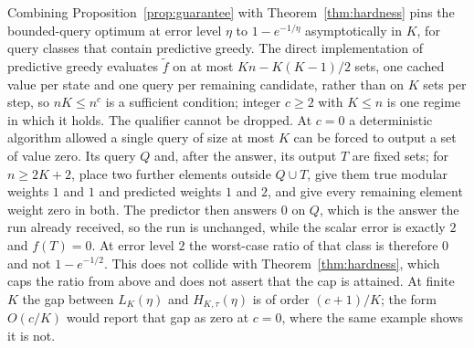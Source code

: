 \begin{remark}\label{rem:hardness-pins}
Combining Proposition~\ref{prop:guarantee} with Theorem~\ref{thm:hardness}
pins the bounded-query optimum at error level $\eta$ to $1-e^{-1/\eta}$
asymptotically in $K$, for query classes that contain predictive greedy.  The
direct implementation of predictive greedy evaluates $\tilde f$ on at most
$Kn-K(K-1)/2$ sets, one cached value per state and one query per remaining
candidate, rather than on $K$ sets per step, so $nK\le n^{c}$ is a sufficient
condition; integer $c\ge2$ with $K\le n$ is one regime in which it holds.  The
qualifier cannot be dropped.  At $c=0$ a deterministic algorithm allowed a
single query of size at most $K$ can be forced to output a set of value zero.
Its query $Q$ and, after the answer, its output $T$ are fixed sets; for
$n\ge2K+2$, place two further elements outside $Q\cup T$, give them true
modular weights $1$ and $1$ and predicted weights $1$ and $2$, and give every
remaining element weight zero in both.  The predictor then answers $0$ on $Q$,
which is the answer the run already received, so the run is unchanged, while
the scalar error is exactly $2$ and $f(T)=0$.  At error level $2$ the
worst-case ratio of that class is therefore $0$ and not $1-e^{-1/2}$.  This
does not collide with Theorem~\ref{thm:hardness}, which caps the ratio from
above and does not assert that the cap is attained.  At finite $K$ the gap
between $L_K(\eta)$ and $H_{K,\tau}(\eta)$ is of order $(c+1)/K$; the form
$O(c/K)$ would report that gap as zero at $c=0$, where the same example shows
it is not.
\end{remark}

